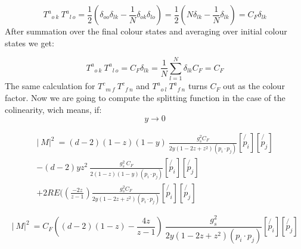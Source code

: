 \begin{equation}
{T^a}_{o\:k} \: {T^a}_{l\:o} = \frac{1}{2}(\delta_{oo}\delta_{lk}-\frac{1}{N}\delta_{ok}\delta_{lo})= \frac{1}{2}(N\delta_{lk}-\frac{1}{N}\delta_{lk})=C_F \delta_{lk}
\end{equation}
After summation over the final colour states and averaging over initial colour states we get:

\begin{equation}
{T^a}_{o\:k} \: {T^a}_{l\:o}=C_F \delta_{lk}=\frac{1}{N} \displaystyle\sum\limits_{l=1}^ N \delta_{lk}C_F=C_F
\end{equation}
The same calculation for $ {T^c}_{m\:f} \: {T^c}_{f\:n} $ and $ {T^a}_{o\:l} \: {T^a}_{f\:n} $ turns $ C_F $ out as the colour factor.
Now we are going to compute the splitting function in the case of the colinearity, wich means, if:
\begin{equation}
y \longrightarrow 0
\end{equation}

\begin{equation}
\begin{split}
\lvert\:M\lvert^2\: = (d-2)(1-z)(1-y)\:\frac{g_s^2 C_F}{2y(1-2z+z^2)(p_i \cdot p_j)}
[\not{p_i}][\not{p_j}]\\
-(d-2)yz^2\:\frac{g_s^2 \: C_F }{2(1-z)(1-y)(p_i \cdot p_j)}
[\not{p_i}][\not{p_j}]\\
+2RE((\frac{-2z}{z-1}) \frac{g_s^2 C_F}{2y(1-2z+z^2)(p_i \cdot p_j)} 
[\not{p_i}][\not{p_j}]
\end{split}
\end{equation}

\begin{equation}
\lvert\:M\lvert^2\: = C_F((d-2)(1-z)-\frac{4z}{z-1})\:\frac{g_s^2}{2y(1-2z+z^2)(p_i \cdot p_j)}[\not{p_i}][\not{p_j}]
\end{equation}
\newpage
